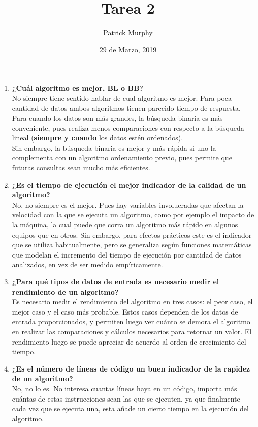 \documentclass[letterpaper,12pt]{article}
\begin{document}
\title{Tarea 2}
\author{Patrick Murphy}
\date{29 de Marzo, 2019}
\maketitle
{}

\begin{enumerate}
  \item \textbf{¿Cuál algoritmo es mejor, BL o BB?} \\
  \-\hspace{0.5 cm} No siempre tiene sentido hablar de cual algoritmo es mejor. Para poca cantidad de datos ambos algoritmos tienen parecido tiempo de respuesta. Para cuando los datos son más grandes, la búsqueda binaria es más conveniente, pues realiza menos comparaciones con respecto a la búsqueda lineal (\textbf{siempre y cuando} los datos estén ordenados). \\
  \-\hspace{0.5cm} Sin embargo, la búsqueda binaria es mejor y más rápida si uno la complementa con un algoritmo ordenamiento previo, pues permite que futuras consultas sean mucho más eficientes.

  \item \textbf{¿Es el tiempo de ejecución el mejor indicador de la calidad de un algoritmo?} \\
  \-\hspace{0.5cm} No, no siempre es el mejor. Pues hay variables involucradas que afectan la velocidad con la que se ejecuta un algoritmo, como por ejemplo el impacto de la máquina, la cual puede que corra un algoritmo más rápido en algunos equipos que en otros. Sin embargo, para efectos prácticos este es el indicador que se utiliza habitualmente, pero se generaliza según funciones matemáticas que modelan el incremento del tiempo de ejecución por cantidad de datos analizados, en vez de ser medido empíricamente.

  \item \textbf{¿Para qué tipos de datos de entrada es necesario medir el rendimiento de un algoritmo?} \\
  \-\hspace{0.5 cm} Es necesario medir el rendimiento del algoritmo en tres casos: el peor caso, el mejor caso y el caso más probable. Estos casos dependen de los datos de entrada proporcionados, y permiten luego ver cuánto se demora el algoritmo en realizar las comparaciones y cálculos necesarios para retornar un valor. El rendimiento luego se puede apreciar de acuerdo al orden de crecimiento del tiempo.

  \item \textbf{¿Es el número de líneas de código un buen indicador de la rapidez de un algoritmo?} \\
  \-\hspace{0.5cm} No, no lo es. No interesa cuantas líneas haya en un código, importa más cuántas de estas instrucciones sean las que se ejecuten, ya que finalmente cada vez que se ejecuta una, esta añade un cierto tiempo en la ejecución del algoritmo.

\end{enumerate}
\end{document}
